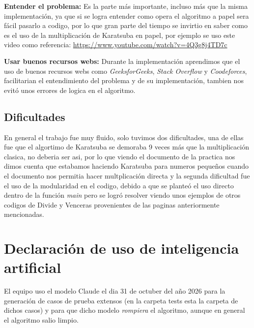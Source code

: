 \documentclass[11pt,a4paper]{article}
\begin{document}
\textbf{Entender el problema: } Es la parte más importante, incluso más que la misma implementación, ya que si se logra entender como opera el algoritmo a papel
sera fácil pasarlo a codigo, por lo que gran parte del tiempo se invirtio en saber como es el uso de la multiplicación de Karatsuba en papel, por ejemplo se uso
este video como referencia: \url{https://www.youtube.com/watch?v=4Q3g8j4TD7c}

\textbf{Usar buenos recursos webs: } Durante la implementación aprendimos que el uso de buenos recursos webs como \textit{GeeksforGeeks}, \textit{Stack Overflow} y \textit{Coodeforces}, facilitarian el entendimiento del problema y de su implementación, tambien nos evitó unos errores de logica en el algoritmo.

\subsection{Dificultades}
En general el trabajo fue muy fluido, solo tuvimos dos dificultades, una de ellas fue que el algortimo de Karatsuba se demoraba 9 veces más que la multiplicación clasica, no deberia ser asi,
por lo que viendo el documento de la practica nos dimos cuenta que estabamos haciendo Karatsuba para numeros pequeños cuando el documento nos permitia hacer multplicación directa y la segunda dificultad fue el uso de la modularidad en el codigo, debido a que se planteó el uso directo dentro de la función \textit{main} pero se logró resolver viendo unos ejemplos de otros codigos de Divide y Venceras provenientes de las paginas anteriormente mencionadas.

\section*{Declaración de uso de inteligencia artificial}

El equipo uso el modelo Claude el dia 31 de octuber del año 2026 para la generación de casos de prueba extensos (en la carpeta tests esta la carpeta de dichos casos) y para que dicho modelo \textit{rompiera} el algoritmo, aunque en general el algoritmo salio limpio.
\end{document}
